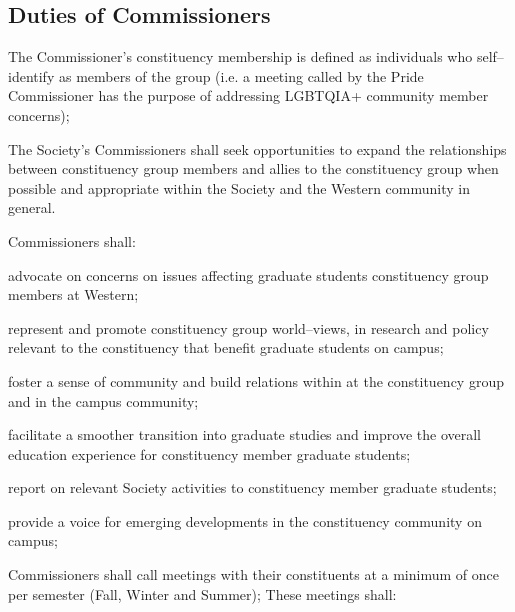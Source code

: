 \subsection{Duties of Commissioners}
\begin{longenum}[ label*=\thesubsection.\arabic*., align=left]
\item The Commissioner's constituency membership is defined as individuals who self--identify as members of the group (i.e. a meeting called by the Pride Commissioner has the purpose of addressing LGBTQIA+ community member concerns);

\item The Society's Commissioners shall seek opportunities to expand the relationships between constituency group members and allies to the constituency group when possible and appropriate within the Society and the Western community in general.
\item Commissioners shall:
\begin{longenum}[ label*=\arabic*., align=left]
\item  advocate on concerns on issues affecting graduate students constituency group members at Western;
\item  represent and promote constituency group world--views, in research and policy relevant to the constituency that benefit graduate students on campus;
\item  foster a sense of community and build relations within at the constituency group and in the campus community;
\item  facilitate a smoother transition into graduate studies and improve the overall education experience for constituency member graduate students;
\item report on relevant Society activities to constituency member graduate students;
\item  provide a voice for emerging developments in the constituency community on campus;
\end{longenum}
\item Commissioners shall call meetings with their constituents at a minimum of once per semester (Fall, Winter and Summer);\newline
These meetings shall:
\begin{longenum}[ label*=\arabic*., align=left]



\end{longenum}
\end{longenum}
